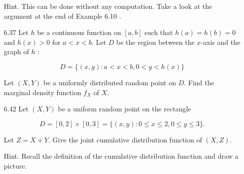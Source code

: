 \documentclass[10pt]{article}
\begin{document}
\begin{itemize}
Hint. This can be done without any computation. Take a look at the argument at the end of Example 6.10 .

\newpage
	\item[6.37] Let $h$ be a continuous function on $[a, b]$ such that $h(a)=h(b)=0$ and $h(x)>0$ for $a<x<b$. Let $D$ be the region between the $x$-axis and the graph of $h$ :

$$
D=\{(x, y): a<x<b, 0<y<h(x)\}
$$

Let $(X, Y)$ be a uniformly distributed random point on $D$. Find the marginal density function $f_{X}$ of $X$.

\newpage
	\item[6.42] Let $(X, Y)$ be a uniform random point on the rectangle

$$
D=[0,2] \times[0,3]=\{(x, y): 0 \leq x \leq 2,0 \leq y \leq 3\} .
$$

Let $Z=X+Y$. Give the joint cumulative distribution function of $(X, Z)$.

Hint. Recall the definition of the cumulative distribution function and draw a picture.

\end{itemize}
\end{document}
